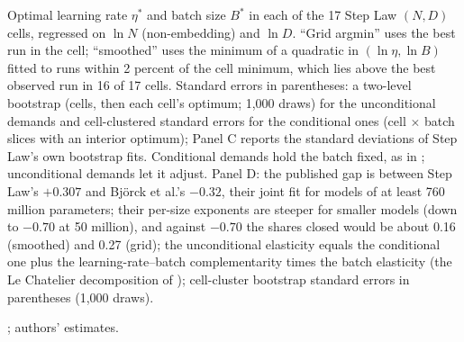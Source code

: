 \begin{table}[tp]
\par\smallskip
\begin{tablenotes}Optimal learning rate $\eta^*$ and batch size $B^*$ in each of the 17 Step Law $(N,D)$ cells, regressed
on $\ln N$ (non-embedding) and $\ln D$. ``Grid argmin'' uses the best run in the cell; ``smoothed'' uses the minimum of a
quadratic in $(\ln\eta,\ln B)$ fitted to runs within 2 percent of the cell minimum, which lies above the best observed
run in 16 of 17 cells. Standard errors in parentheses: a two-level bootstrap (cells, then each cell's optimum; 1,000
draws) for the unconditional demands and cell-clustered standard errors for the conditional ones (cell $\times$ batch
slices with an interior optimum); Panel C reports the standard deviations of Step Law's own bootstrap fits. Conditional
demands hold the batch fixed, as in \citet{bjorck2024scaling}; unconditional demands let it adjust. Panel D: the published gap is between Step Law's $+0.307$ and
Bj\"orck et al.'s $-0.32$, their joint fit for models of at least 760 million parameters; their per-size exponents are
steeper for smaller models (down to $-0.70$ at 50 million), and against $-0.70$ the shares closed would be about 0.16
(smoothed) and 0.27 (grid); the unconditional elasticity equals the conditional one plus the learning-rate--batch complementarity times the batch
elasticity (the Le Chatelier decomposition of \citealt{milgrom1996lechatelier}); cell-cluster bootstrap standard errors
in parentheses (1,000 draws).\end{tablenotes}
\begin{tablenotes}[Source]\citet{li2025predictablea}; authors' estimates.\end{tablenotes}
\end{table}
